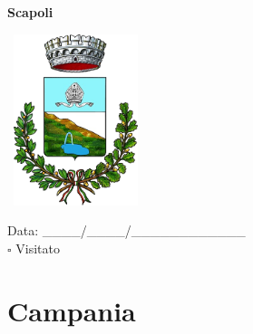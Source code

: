 \documentclass[a5paper,12pt]{article}
\begin{document}
\newpage

\noindent
\begin{minipage}[t]{0.45\textwidth}
    \begin{center}
        \textbf{Scapoli}
    \end{center}
    \vspace{-0.5cm} %
    \begin{center}
        \includegraphics[height= 5cm, width=4cm]{Molise/Scapoli-Stemma.png}
    \end{center}
    \vspace{-0.4cm} %
    \begin{flushleft}
        Data: \_\_\_\_/\_\_\_\_/\_\_\_\_\_\_\_\_\_\_\_\_ \\
        $\square$ Visitato
    \end{flushleft}
\end{minipage}

\newpage

\section*{Campania}

\newpage
\end{document}
